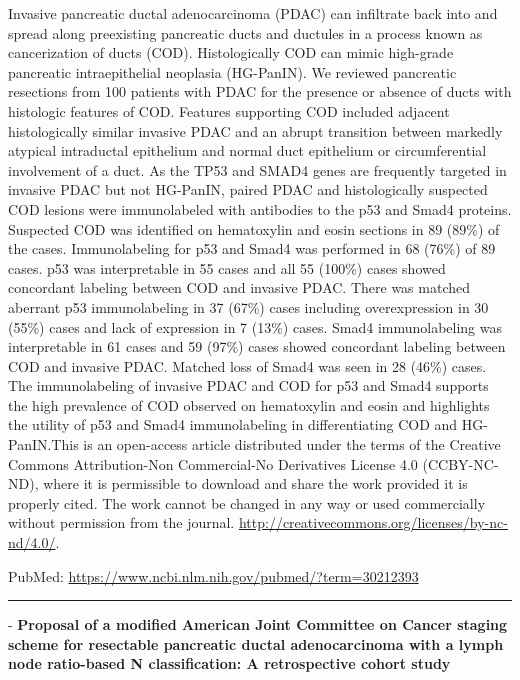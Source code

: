 \documentclass[]{article}
\begin{document}
Invasive pancreatic ductal adenocarcinoma (PDAC) can infiltrate back
into and spread along preexisting pancreatic ducts and ductules in a
process known as cancerization of ducts (COD). Histologically COD can
mimic high-grade pancreatic intraepithelial neoplasia (HG-PanIN). We
reviewed pancreatic resections from 100 patients with PDAC for the
presence or absence of ducts with histologic features of COD. Features
supporting COD included adjacent histologically similar invasive PDAC
and an abrupt transition between markedly atypical intraductal
epithelium and normal duct epithelium or circumferential involvement of
a duct. As the TP53 and SMAD4 genes are frequently targeted in invasive
PDAC but not HG-PanIN, paired PDAC and histologically suspected COD
lesions were immunolabeled with antibodies to the p53 and Smad4
proteins. Suspected COD was identified on hematoxylin and eosin sections
in 89 (89\%) of the cases. Immunolabeling for p53 and Smad4 was
performed in 68 (76\%) of 89 cases. p53 was interpretable in 55 cases
and all 55 (100\%) cases showed concordant labeling between COD and
invasive PDAC. There was matched aberrant p53 immunolabeling in 37
(67\%) cases including overexpression in 30 (55\%) cases and lack of
expression in 7 (13\%) cases. Smad4 immunolabeling was interpretable in
61 cases and 59 (97\%) cases showed concordant labeling between COD and
invasive PDAC. Matched loss of Smad4 was seen in 28 (46\%) cases. The
immunolabeling of invasive PDAC and COD for p53 and Smad4 supports the
high prevalence of COD observed on hematoxylin and eosin and highlights
the utility of p53 and Smad4 immunolabeling in differentiating COD and
HG-PanIN.This is an open-access article distributed under the terms of
the Creative Commons Attribution-Non Commercial-No Derivatives License
4.0 (CCBY-NC-ND), where it is permissible to download and share the work
provided it is properly cited. The work cannot be changed in any way or
used commercially without permission from the journal.
\url{http://creativecommons.org/licenses/by-nc-nd/4.0/}.

PubMed: \url{https://www.ncbi.nlm.nih.gov/pubmed/?term=30212393}

{}

{}

\begin{center}\rule{0.5\linewidth}{\linethickness}\end{center}

 - \textbf{Proposal of a modified American Joint Committee on Cancer
staging scheme for resectable pancreatic ductal adenocarcinoma with a
lymph node ratio-based N classification: A retrospective cohort study}
\end{document}
